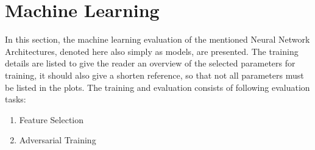 \section{Machine Learning}\label{sec:ml}
In this section, the machine learning evaluation of the mentioned Neural Network Architectures, denoted here also simply as models, are presented.
The training details are listed to give the reader an overview of the selected parameters for training, it should also give a shorten reference, so that not all parameters must be listed in the plots. 
The training and evaluation consists of following evaluation tasks:
\begin{enumerate}
  \item Feature Selection
  \item Adversarial Training
\end{enumerate}
